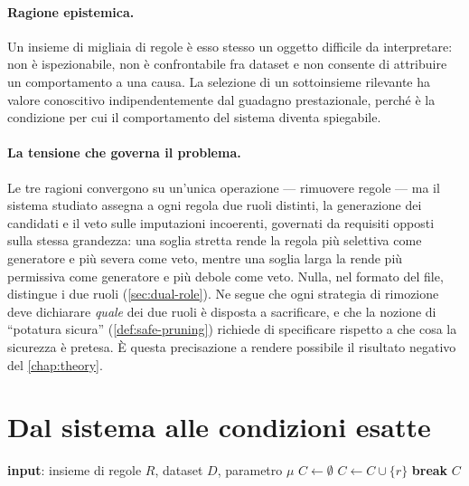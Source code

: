 \paragraph{Ragione epistemica.} Un insieme di migliaia di regole è esso stesso un oggetto
difficile da interpretare: non è ispezionabile, non è confrontabile fra dataset e non consente di
attribuire un comportamento a una causa. La selezione di un sottoinsieme rilevante ha valore
conoscitivo indipendentemente dal guadagno prestazionale, perché è la condizione per cui il
comportamento del sistema diventa spiegabile.

\paragraph{La tensione che governa il problema.} Le tre ragioni convergono su un'unica
operazione --- rimuovere regole --- ma il sistema studiato assegna a ogni regola due ruoli
distinti, la generazione dei candidati e il veto sulle imputazioni incoerenti, governati da
requisiti opposti sulla stessa grandezza: una soglia stretta rende la regola più selettiva come
generatore e più severa come veto, mentre una soglia larga la rende più permissiva come generatore
e più debole come veto. Nulla, nel formato del file, distingue i due ruoli
(\autoref{sec:dual-role}). Ne segue che ogni strategia di rimozione deve dichiarare
\emph{quale} dei due ruoli è disposta a sacrificare, e che la nozione di ``potatura sicura''
(\autoref{def:safe-pruning}) richiede di specificare rispetto a che cosa la sicurezza è pretesa.
È questa precisazione a rendere possibile il risultato negativo del \autoref{chap:theory}.

\section{Dal sistema alle condizioni esatte}\label{sec:exact-conditions}

\begin{algorithm}[htbp]
\caption{Ricerca dei copritori per la condizione \Vtwo{}. Il parametro $\mu$ limita la differenza
di ampiezza fra il lato sinistro della regola coprente e quello della regola coperta; la
\autoref{sec:maxextra} mostra che il risultato non dipende dal suo valore.}
\label{alg:cover}
\begin{algorithmic}[1]
\State \textbf{input}: insieme di regole $R$, dataset $D$, parametro $\mu$
\State $C \gets \emptyset$ 
            \State $C \gets C \cup \{r\}$ 
            \State \textbf{break}
        \EndIf
    \EndFor
\EndFor
\State \Return $C$
\end{algorithmic}
\end{algorithm}

